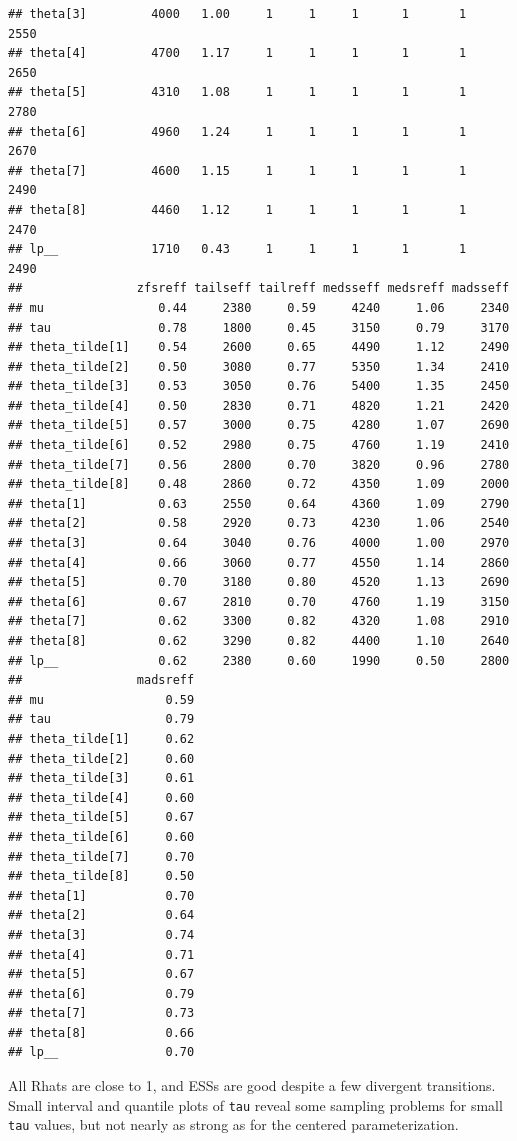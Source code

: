 \documentclass[american,]{article}
\begin{document}
\begin{verbatim}
## theta[3]         4000   1.00     1     1     1      1       1    2550
## theta[4]         4700   1.17     1     1     1      1       1    2650
## theta[5]         4310   1.08     1     1     1      1       1    2780
## theta[6]         4960   1.24     1     1     1      1       1    2670
## theta[7]         4600   1.15     1     1     1      1       1    2490
## theta[8]         4460   1.12     1     1     1      1       1    2470
## lp__             1710   0.43     1     1     1      1       1    2490
##                zfsreff tailseff tailreff medsseff medsreff madsseff
## mu                0.44     2380     0.59     4240     1.06     2340
## tau               0.78     1800     0.45     3150     0.79     3170
## theta_tilde[1]    0.54     2600     0.65     4490     1.12     2490
## theta_tilde[2]    0.50     3080     0.77     5350     1.34     2410
## theta_tilde[3]    0.53     3050     0.76     5400     1.35     2450
## theta_tilde[4]    0.50     2830     0.71     4820     1.21     2420
## theta_tilde[5]    0.57     3000     0.75     4280     1.07     2690
## theta_tilde[6]    0.52     2980     0.75     4760     1.19     2410
## theta_tilde[7]    0.56     2800     0.70     3820     0.96     2780
## theta_tilde[8]    0.48     2860     0.72     4350     1.09     2000
## theta[1]          0.63     2550     0.64     4360     1.09     2790
## theta[2]          0.58     2920     0.73     4230     1.06     2540
## theta[3]          0.64     3040     0.76     4000     1.00     2970
## theta[4]          0.66     3060     0.77     4550     1.14     2860
## theta[5]          0.70     3180     0.80     4520     1.13     2690
## theta[6]          0.67     2810     0.70     4760     1.19     3150
## theta[7]          0.62     3300     0.82     4320     1.08     2910
## theta[8]          0.62     3290     0.82     4400     1.10     2640
## lp__              0.62     2380     0.60     1990     0.50     2800
##                madsreff
## mu                 0.59
## tau                0.79
## theta_tilde[1]     0.62
## theta_tilde[2]     0.60
## theta_tilde[3]     0.61
## theta_tilde[4]     0.60
## theta_tilde[5]     0.67
## theta_tilde[6]     0.60
## theta_tilde[7]     0.70
## theta_tilde[8]     0.50
## theta[1]           0.70
## theta[2]           0.64
## theta[3]           0.74
## theta[4]           0.71
## theta[5]           0.67
## theta[6]           0.79
## theta[7]           0.73
## theta[8]           0.66
## lp__               0.70
\end{verbatim}

All Rhats are close to 1, and ESSs are good despite a few divergent
transitions. Small interval and quantile plots of \texttt{tau} reveal
some sampling problems for small \texttt{tau} values, but not nearly as
strong as for the centered parameterization.
\end{document}
